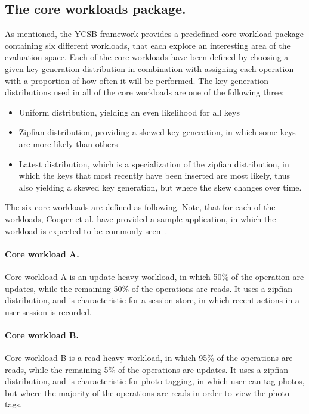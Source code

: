 \documentclass[11pt]{report} %
\begin{document}
\subsection{The core workloads package.}
\label{background:ycsb_core_workload}
As mentioned, the YCSB framework provides a predefined core workload package containing six different workloads, that each explore an interesting area of the evaluation space. Each of the core workloads have been defined by choosing a given key generation distribution in combination with assigning each operation with a proportion of how often it will be performed. The key generation distributions used in all of the core workloads are one of the following three:
\begin{itemize}[noitemsep]
  \item Uniform distribution, yielding an even likelihood for all keys
  \item Zipfian distribution, providing a skewed key generation, in which some keys are more likely than others
  \item Latest distribution, which is a specialization of the zipfian distribution, in which the keys that most recently have been inserted are most likely, thus also yielding a skewed key generation, but where the skew changes over time.
\end{itemize}
The six core workloads are defined as following. Note, that for each of the workloads, Cooper et al. have provided a sample application, in which the workload is expected to be commonly seen~\cite{BC10}. 

\paragraph{Core workload A.}
Core workload A is an update heavy workload, in which 50\% of the operation are updates, while the remaining 50\% of the operations are reads. It uses a zipfian distribution, and is characteristic for a session store, in which recent actions in a user session is recorded.

\paragraph{Core workload B.} 
Core workload B is a read heavy workload, in which 95\% of the operations are reads, while the remaining 5\% of the operations are updates. It uses a zipfian distribution, and is characteristic for photo tagging, in which user can tag photos, but where the majority of the operations are reads in order to view the photo tags.
\end{document}
